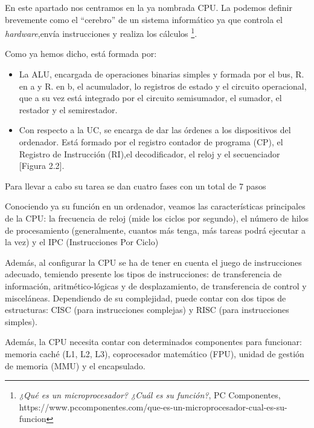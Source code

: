 \documentclass{book}
\begin{document}
\begin{large}

    En este apartado nos centramos en la ya nombrada CPU. La podemos definir brevemente como el ``cerebro'' de un sistema informático ya que controla el \textit{hardware},envía instrucciones y realiza los cálculos \footnote {\normalsize \textit{¿Qué es un microprocesador? ¿Cuál es su función?}, PC Componentes, https://www.pccomponentes.com/que-es-un-microprocesador-cual-es-su-funcion}.

    Como ya hemos dicho, está formada por:

    \begin{itemize}

        \item La ALU, encargada de operaciones binarias simples y formada por el bus, R. en a y R. en b, el acumulador, lo registros de estado y el circuito operacional, que a su vez está integrado por el circuito semisumador, el sumador, el restador y el semirestador.

        \item  Con respecto a la UC, se encarga de dar las órdenes a los dispositivos del ordenador. Está formado por el registro contador de programa (CP), el Registro de Instrucción (RI),el decodificador, el reloj y el secuenciador [Figura 2.2].


    \end{itemize}

    Para llevar a cabo su tarea se dan cuatro fases con un total de 7 pasos %

    Conociendo ya su función en un ordenador, veamos las características principales de la CPU: la frecuencia de reloj (mide los ciclos por segundo), el número de hilos de procesamiento (generalmente, cuantos más tenga, más tareas podrá ejecutar a la vez) y el IPC (Instrucciones Por Ciclo)

    Además, al configurar la CPU se ha de tener en cuenta el juego de instrucciones adecuado, temiendo presente los tipos de instrucciones: de transferencia de información, aritmético-lógicas y de desplazamiento, de transferencia de control y misceláneas. Dependiendo de su complejidad, puede contar con dos tipos de estructuras: CISC (para instrucciones complejas) y RISC (para instrucciones simples).

    Además, la CPU necesita contar con determinados componentes para funcionar: memoria caché (L1, L2, L3), coprocesador matemático (FPU), unidad de gestión de memoria (MMU) y el encapsulado.

\end{large}
\end{document}
